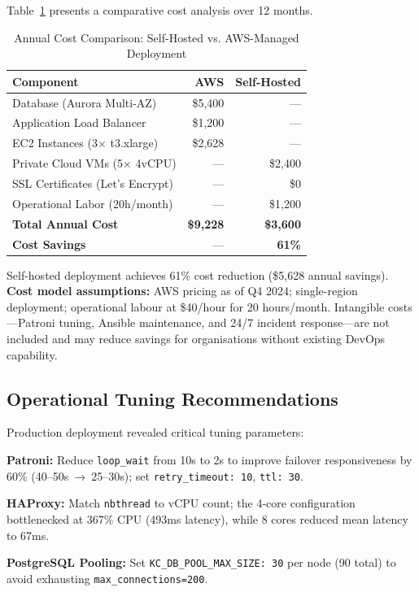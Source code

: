 \documentclass[a4paper,twoside]{article}
\begin{document}
Table~\ref{tab:cost-analysis} presents a comparative cost analysis over 12 months.

\begin{table}[!t]
\centering
\caption{Annual Cost Comparison: Self-Hosted vs. AWS-Managed Deployment}
\label{tab:cost-analysis}
\small
\begin{tabular}{|l|r|r|}
\hline
\textbf{Component} & \textbf{AWS} & \textbf{Self-Hosted} \\
\hline
Database (Aurora Multi-AZ) & \$5,400 & --- \\
Application Load Balancer & \$1,200 & --- \\
EC2 Instances (3× t3.xlarge) & \$2,628 & --- \\
\hline
Private Cloud VMs (5× 4vCPU) & --- & \$2,400 \\
SSL Certificates (Let's Encrypt) & --- & \$0 \\
Operational Labor (20h/month) & --- & \$1,200 \\
\hline
\textbf{Total Annual Cost} & \textbf{\$9,228} & \textbf{\$3,600} \\
\textbf{Cost Savings} & --- & \textbf{61\%} \\
\hline
\end{tabular}
\end{table}

Self-hosted deployment achieves 61\% cost reduction (\$5,628 annual savings). \textbf{Cost model assumptions:} AWS pricing as of Q4 2024; single-region deployment; operational labour at \$40/hour for 20 hours/month. Intangible costs---Patroni tuning, Ansible maintenance, and 24/7 incident response---are not included and may reduce savings for organisations without existing DevOps capability.

\subsection{Operational Tuning Recommendations}

Production deployment revealed critical tuning parameters:

\textbf{Patroni:} Reduce \texttt{loop\_wait} from 10s to 2s to improve failover responsiveness by 60\% (40--50s~→~25--30s); set \texttt{retry\_timeout: 10}, \texttt{ttl: 30}.

\textbf{HAProxy:} Match \texttt{nbthread} to vCPU count; the 4-core configuration bottlenecked at 367\% CPU (493ms latency), while 8 cores reduced mean latency to 67ms.

\textbf{PostgreSQL Pooling:} Set \texttt{KC\_DB\_POOL\_MAX\_SIZE: 30} per node (90 total) to avoid exhausting \texttt{max\_connections=200}.
\end{document}
